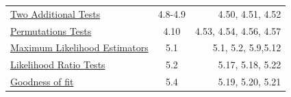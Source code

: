 \documentclass[]{book}
\theoremstyle{definition}
\theoremstyle{definition}
\theoremstyle{definition}
\theoremstyle{remark}
\begin{document}
\begin{longtable}[]{@{}lcr@{}}
\begin{minipage}[t]{0.29\columnwidth}
\protect\hyperlink{L23}{Two Additional Tests}\strut
\end{minipage} & \begin{minipage}[t]{0.33\columnwidth}\centering\strut
4.8-4.9\strut
\end{minipage} & \begin{minipage}[t]{0.29\columnwidth}\raggedleft\strut
4.50, 4.51, 4.52\strut
\end{minipage}\tabularnewline
\begin{minipage}[t]{0.29\columnwidth}\raggedright\strut
\protect\hyperlink{L24}{Permutations Tests}\strut
\end{minipage} & \begin{minipage}[t]{0.33\columnwidth}\centering\strut
4.10\strut
\end{minipage} & \begin{minipage}[t]{0.29\columnwidth}\raggedleft\strut
4.53, 4.54, 4.56, 4.57\strut
\end{minipage}\tabularnewline
\begin{minipage}[t]{0.29\columnwidth}\raggedright\strut
\protect\hyperlink{L25}{Maximum Likelihood Estimators}\strut
\end{minipage} & \begin{minipage}[t]{0.33\columnwidth}\centering\strut
5.1\strut
\end{minipage} & \begin{minipage}[t]{0.29\columnwidth}\raggedleft\strut
5.1, 5.2, 5.9,5.12\strut
\end{minipage}\tabularnewline
\begin{minipage}[t]{0.29\columnwidth}\raggedright\strut
\protect\hyperlink{LRT}{Likelihood Ratio Tests}\strut
\end{minipage} & \begin{minipage}[t]{0.33\columnwidth}\centering\strut
5.2\strut
\end{minipage} & \begin{minipage}[t]{0.29\columnwidth}\raggedleft\strut
5.17, 5.18, 5.22\strut
\end{minipage}\tabularnewline
\begin{minipage}[t]{0.29\columnwidth}\raggedright\strut
\protect\hyperlink{L27}{Goodness of fit}\strut
\end{minipage} & \begin{minipage}[t]{0.33\columnwidth}\centering\strut
5.4\strut
\end{minipage} & \begin{minipage}[t]{0.29\columnwidth}\raggedleft\strut
5.19, 5.20, 5.21\strut

\end{minipage}
\end{longtable}
\end{document}
